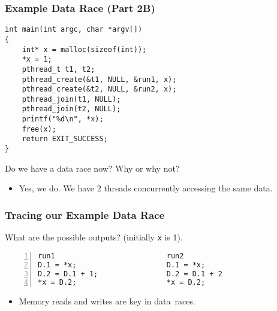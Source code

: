 \documentclass[aspectratio=43]{beamer}
\newenvironment{changemargin}[1]{%
  \begin{list}{}{%
    \setlength{\topsep}{0pt}%
    \setlength{\leftmargin}{#1}%
    \setlength{\rightmargin}{1em}
    \setlength{\listparindent}{\parindent}%
    \setlength{\itemindent}{\parindent}%
    \setlength{\parsep}{\parskip}%
  }%
  \item[]}{\end{list}}
\begin{document}
\begin{frame}[fragile]
  \frametitle{Example Data Race (Part 2B)}

  \begin{changemargin}{2.5cm}
  \begin{lstlisting}
int main(int argc, char *argv[])
{
    int* x = malloc(sizeof(int));
    *x = 1;
    pthread_t t1, t2;
    pthread_create(&t1, NULL, &run1, x);
    pthread_create(&t2, NULL, &run2, x);
    pthread_join(t1, NULL);
    pthread_join(t2, NULL);
    printf("%d\n", *x);
    free(x);
    return EXIT_SUCCESS;
}
  \end{lstlisting}

    Do we have a data race now? Why or why not?
  \begin{itemize}
    \item <2-> Yes, we do. We have 2 threads concurrently accessing the same data.
  \end{itemize}
   \end{changemargin}

\end{frame}

\begin{frame}[fragile]
  \frametitle{Tracing our Example Data Race}

  \begin{changemargin}{2.5cm}
   What are the possible outputs? (initially {\tt *x} is 1).

  \begin{lstlisting}[numbers=left]
run1                          run2   
D.1 = *x;                     D.1 = *x;
D.2 = D.1 + 1;                D.2 = D.1 + 2
*x = D.2;                     *x = D.2;
  \end{lstlisting}

  \begin{itemize}
    \item Memory reads and writes are key in data~races.
  \end{itemize}
  \end{changemargin}

\end{frame}
\end{document}
